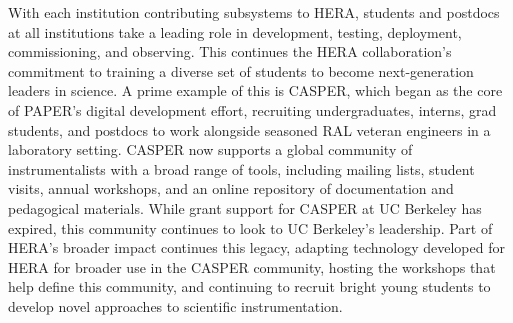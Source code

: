 \documentclass[preprint]{aastex}
\begin{document}
With each institution contributing subsystems to HERA,
students and postdocs at all institutions take a leading role in development,
testing, deployment, commissioning, and observing.
This continues the HERA collaboration's commitment to
training a diverse set of students to become next-generation leaders in science.  
A prime example of this is CASPER, which began as the core of PAPER's digital development effort,
recruiting undergraduates, interns, grad students, and
postdocs to work alongside seasoned RAL veteran engineers in a laboratory setting.
CASPER now supports a global community of instrumentalists with
a broad range of tools, including mailing lists, student
visits, annual workshops, and an online repository of documentation and pedagogical materials.
While grant support for CASPER at UC Berkeley has expired, this community continues to look
to UC Berkeley's leadership.  Part of HERA's broader impact continues
this legacy, adapting technology developed for HERA for broader use in the CASPER community, 
hosting the workshops that help define this community, and continuing to recruit bright
young students to develop novel approaches to scientific instrumentation.

\end{document}
